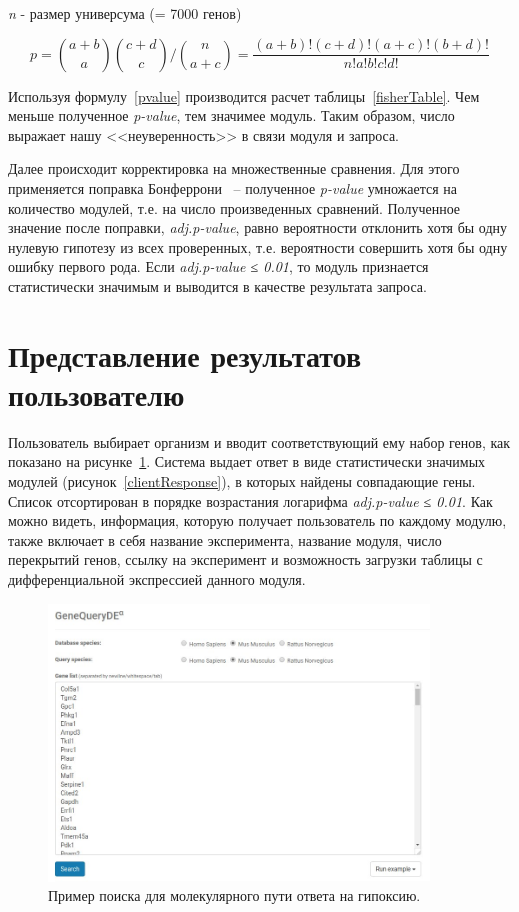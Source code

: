 \documentclass[times,specification,annotation]{itmo-student-thesis}
\begin{document}
\textit{n} - размер универсума (= 7000 генов)

\begin{equation}
\label{pvalue}
    p = \binom{a+b}{a}\binom{c + d}{c}/\binom{n}{a+c} = \frac{(a+b)!(c+d)!(a+c)!(b+d)!}{n!a!b!c!d!}
\end{equation}

Используя формулу~\ref{pvalue} производится расчет таблицы~\ref{fisherTable}. Чем меньше полученное \textit{p-value}, тем значимее модуль. Таким образом, число выражает нашу <<неуверенность>> в связи модуля и запроса. 

Далее происходит корректировка на множественные сравнения. Для этого применяется поправка Бонферрони\cite{Bonferroni} ~-- полученное \textit{p-value} умножается на количество модулей, т.е. на число произведенных сравнений. Полученное значение после поправки, \textit{adj.p-value}, равно вероятности отклонить хотя бы одну нулевую гипотезу из всех проверенных, т.е. вероятности совершить хотя бы одну ошибку первого рода. Если \textit{adj.p-value ≤ 0.01}, то модуль признается статистически значимым и выводится в качестве результата запроса.

\section{Представление результатов пользователю}

Пользователь выбирает организм и вводит соответствующий ему набор генов, как показано на рисунке~\ref{clientRequest}. Система выдает ответ в виде статистически значимых модулей (рисунок~\ref{clientResponse}), в которых найдены совпадающие гены. Список отсортирован в порядке возрастания логарифма \textit{adj.p-value ≤ 0.01}. Как можно видеть, информация, которую получает пользователь по каждому модулю, также включает в себя название эксперимента, название модуля, число перекрытий генов, ссылку на эксперимент и возможность загрузки таблицы с дифференциальной экспрессией данного модуля.

\begin{figure}[!h]
    \caption{Пример поиска для молекулярного пути ответа на гипоксию.}\label{clientRequest}
    \centering
    \includegraphics[width=0.9\textwidth]{request.jpg}
\end{figure}
\end{document}
